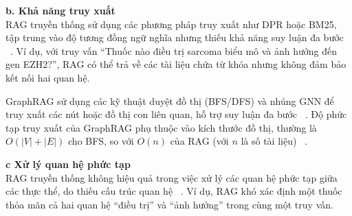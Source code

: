 \documentclass[a4paper]{article}
\begin{document}
\textbf{b.  Khả năng truy xuất\\}
RAG truyền thống sử dụng các phương pháp truy xuất như DPR hoặc BM25, tập trung vào độ tương đồng ngữ nghĩa nhưng thiếu khả năng suy luận đa bước ~\cite{Lewis2020RAG}. Ví dụ, với truy vấn ``Thuốc nào điều trị sarcoma biểu mô và ảnh hưởng đến gen EZH2?'', RAG có thể trả về các tài liệu chứa từ khóa nhưng không đảm bảo kết nối hai quan hệ.

GraphRAG sử dụng các kỹ thuật duyệt đồ thị (BFS/DFS) và nhúng GNN để truy xuất các nút hoặc đồ thị con liên quan, hỗ trợ suy luận đa bước ~\cite{Chen2024GraphRAG}. Độ phức tạp truy xuất của GraphRAG phụ thuộc vào kích thước đồ thị, thường là $O(|V| + |E|)$ cho BFS, so với $O(n)$ của RAG (với $n$ là số tài liệu) ~\cite{Zhang2022GraphIndex}.

\textbf{c   Xử lý quan hệ phức tạp\\}
RAG truyền thống không hiệu quả trong việc xử lý các quan hệ phức tạp giữa các thực thể, do thiếu cấu trúc quan hệ ~\cite{Chen2024GraphRAG}. Ví dụ, RAG khó xác định một thuốc thỏa mãn cả hai quan hệ ``điều trị'' và ``ảnh hưởng'' trong cùng một truy vấn.
\end{document}
